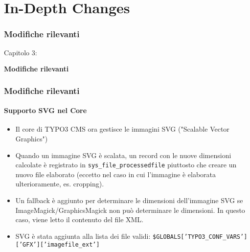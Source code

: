 %

\section{In-Depth Changes}
\begin{frame}[fragile]
	\frametitle{Modifiche rilevanti}

	\begin{center}\huge{Capitolo 3:}\end{center}
	\begin{center}\huge{\color{typo3darkgrey}\textbf{Modifiche rilevanti}}\end{center}

\end{frame}

\begin{frame}[fragile]
	\frametitle{Modifiche rilevanti}
	\framesubtitle{Supporto SVG nel Core}

	\begin{itemize}
		\item Il core di TYPO3 CMS ora gestisce le immagini SVG ("Scalable Vector Graphics")

		\item Quando un immagine SVG è scalata, un record con le nuove dimensioni calcolate
			è registrato in \texttt{sys\_file\_processedfile} piuttosto che creare
			un nuovo file elaborato\newline
			\small(eccetto nel caso in cui l'immagine è elaborata ulterioramente, es. cropping)\normalsize.

		\item Un fallback è aggiunto per determinare le dimensioni dell'immagine SVG se ImageMagick/GraphicsMagick
			non può determinare le dimensioni. In questo caso, viene letto il contenuto del file XML.

		\item SVG è stata aggiunta alla lista dei file validi:\newline
			\texttt{\$GLOBALS['TYPO3\_CONF\_VARS']['GFX']['imagefile\_ext']}

	\end{itemize}

\end{frame}

